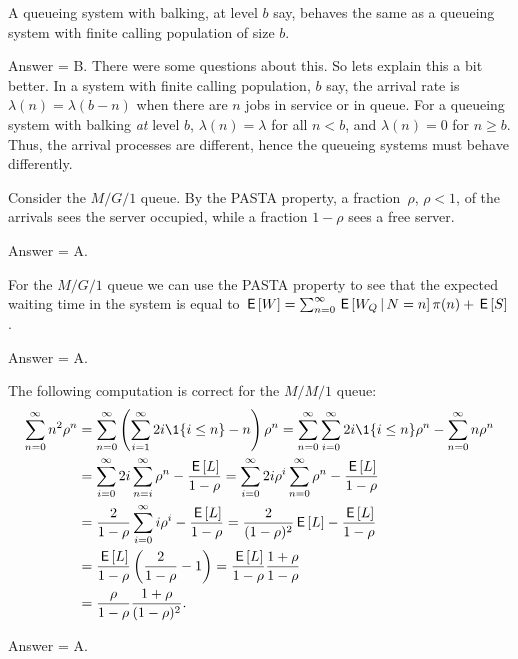 \begin{exercise}[201803]
A queueing system with balking, at level $b$ say, behaves the same as a queueing system with finite calling population of size $b$.
\begin{solution}
Answer = B. There were some questions about this. So lets explain this a bit better. In a system with finite calling population, $b$ say, the arrival rate is $\lambda(n) = \lambda(b-n)$ when there are $n$ jobs in service or in queue. For a queueing system with balking \emph{at} level $b$, $\lambda(n)=\lambda$ for all $n<b$, and $\lambda(n)=0$ for $n\geq b$. Thus, the arrival processes are different, hence the queueing systems must behave differently.
\end{solution}
\end{exercise}

\begin{exercise}[201803]
Consider the $M/G/1$ queue. 
By the PASTA property, a fraction~$\rho$, $\rho<1$, of the arrivals sees the server occupied, while a fraction $1-\rho$ sees a free server. 
\begin{solution}
Answer = A.
\end{solution}
\end{exercise}

\begin{exercise}[201803]
For the $M/G/1$ queue we can use the PASTA property to see that the expected waiting time in the
 system is equal to
 $\,\mathsf{E}\left[W\right] = \sum_{n=0}^\infty \,\mathsf{E}\left[W_Q \,\middle|\, N=n\right] \pi(n) + \,\mathsf{E}\left[S\right]$.
\begin{solution}
Answer = A.
\end{solution}
\end{exercise}

\begin{exercise}[201803]
The following computation is correct for the $M/M/1$ queue:
\begin{equation*}
 \begin{split}
 \sum_{n=0}^\infty n^2 \rho^n 
&= \sum_{n=0}^\infty \left(\sum_{i=1}^\infty 2i \1{i\leq n} - n\right)\rho^n 
= \sum_{n=0}^\infty \sum_{i=0}^\infty 2i\1{i\leq n}\rho^n - \sum_{n=0}^\infty n\rho^n \\
&= \sum_{i=0}^\infty 2i \sum_{n=i}^\infty \rho^n - \frac{\E L}{1-\rho} 
= \sum_{i=0}^\infty 2i \rho^i \sum_{n=0}^\infty \rho^n - \frac{\E L}{1-\rho} \\
&= \frac2{1-\rho} \sum_{i=0}^\infty i \rho^i - \frac{\E L}{1-\rho} 
= \frac2{(1-\rho)^2} \E L - \frac{\E L}{1-\rho} \\
&= \frac{\E L}{1-\rho} \left(\frac2{1-\rho} - 1\right) 
= \frac{\E L}{1-\rho} \frac{1+\rho}{1-\rho} \\
&= \frac{\rho}{1-\rho} \frac{1+\rho}{(1-\rho)^2}.
\end{split}
\end{equation*}

\begin{solution}
Answer = A.
\end{solution}
\end{exercise}

